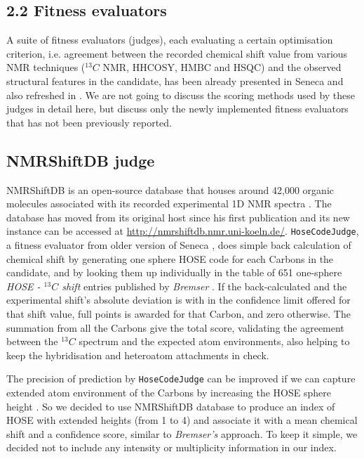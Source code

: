 \documentclass[10pt]{bmc_article}
\newenvironment{bmcformat}{\begin{raggedright}\baselineskip20pt\sloppy\setboolean{publ}{false}}{\end{raggedright}\baselineskip20pt\sloppy}
\begin{document}
\begin{bmcformat}
\subsection*{2.2 Fitness evaluators}
 
 A suite of fitness evaluators (judges), each evaluating a certain optimisation criterion, i.e. agreement between the recorded chemical shift value from various NMR techniques ($^{13}C$ NMR, HHCOSY, HMBC and HSQC) 
 and the observed structural features in the candidate, has been already presented in Seneca \cite{Steinbeck} and also refreshed in \cite{Han}. We are not going to discuss the scoring methods used by these judges in detail here, but discuss only the newly implemented fitness evaluators that has not been previously reported. 
 
 \subsection*{NMRShiftDB judge}
  NMRShiftDB is an open-source database that houses around 42,000 organic molecules associated with its recorded experimental 1D NMR spectra \cite{Kuhn}. The database has moved from its original host since his first publication and its new instance can be accessed at  \url{http://nmrshiftdb.nmr.uni-koeln.de/}. \texttt{HoseCodeJudge}, a fitness evaluator from older version of Seneca \cite{Steinbeck}, does simple back calculation of chemical shift by generating one sphere HOSE code \cite{Bremser:1977} for each Carbons in the candidate, and by looking them up individually in the table of 651 one-sphere  \emph{HOSE - $^{13}C$ shift} entries published by \emph{Bremser} \cite{Bremser:1985}. If the back-calculated and the experimental shift's absolute deviation is with in the confidence limit offered for that shift value, full points is awarded for that Carbon, and zero otherwise. The summation from all the Carbons give the total score, validating the agreement between the $^{13}C$ spectrum and the expected atom environments, also helping to keep the hybridisation and heteroatom attachments in check. 
  
 The precision of prediction by \texttt{HoseCodeJudge} can be improved if we can capture extended atom environment of the Carbons by increasing the HOSE sphere height \cite{Steinbeck}. So we decided to use NMRShiftDB database to produce an index of HOSE with extended heights (from 1 to 4) and associate it with a mean chemical shift and a confidence score, similar to  \emph{Bremser's} approach\cite{Bremser:1985}. To keep it simple, we decided not to include any intensity or multiplicity information in our index.
  

\end{bmcformat}
\end{document}
